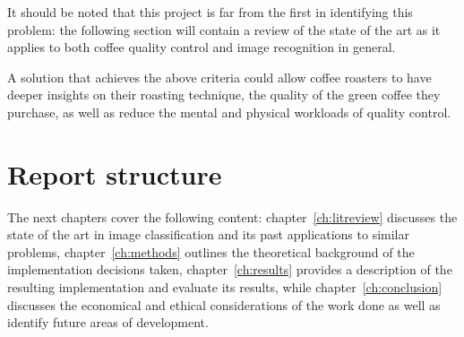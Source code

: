 It should be noted that this project is far from the first in identifying this problem:
the following section will contain a review of the state of the art as it applies to both
coffee quality control and image recognition in general.

A solution that achieves the above criteria could allow coffee roasters to have
deeper insights on their roasting technique, the quality of the green coffee they
purchase, as well as reduce the mental and physical workloads of quality control.

\section{Report structure}
\label{sec:report-structure}
The next chapters cover the following content: chapter~\ref{ch:litreview} discusses the state of the art
in image classification and its past applications to similar problems, chapter~\ref{ch:methods} outlines the theoretical background
of the implementation decisions taken, chapter~\ref{ch:results} provides a description of the resulting implementation and evaluate
its results, while chapter~\ref{ch:conclusion} discusses the economical and ethical considerations of the work done as well as identify future
areas of development.